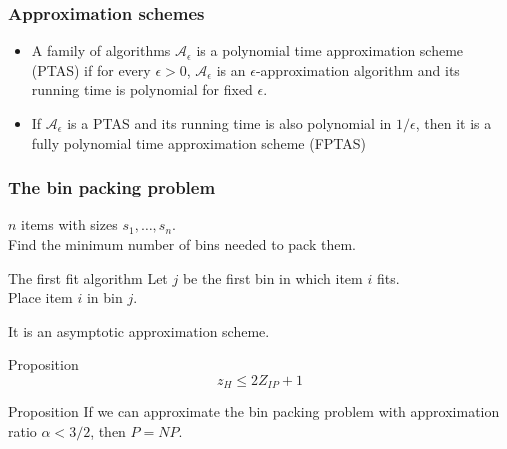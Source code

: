 \documentclass[9pt]{beamer}
\begin{document}
\begin{frame}
\frametitle{Approximation schemes}
\begin{itemize}
\item A family of algorithms $\mathcal A_{\epsilon}$ is a
\alert{polynomial time approximation scheme (PTAS)}
if for every $\epsilon>0$, $\mathcal A_{\epsilon}$ is an $\epsilon$-approximation
algorithm and its running time is polynomial for fixed $\epsilon$.\bigskip
\item If $\mathcal A_{\epsilon}$ is a PTAS and its running time is also
polynomial in $1/\epsilon$, then it is a 
\alert{fully polynomial time approximation scheme (FPTAS)}
\end{itemize}
\end{frame}
\begin{frame}
\frametitle{The bin packing problem}
$n$ items with sizes $s_1, \ldots, s_n$.\\
Find the minimum number of bins needed to \alert{pack them}.
\begin{block}{The first fit algorithm}
Let $j$ be the \alert{first bin} in which item $i$ \alert{fits}.\\
Place item $i$ in bin $j$.
\end{block}
It is an asymptotic approximation scheme.
\begin{block}{Proposition}
$$z_H \leq 2Z_{IP} + 1$$
\end{block}
\begin{block}{Proposition}
If we can approximate the bin packing problem with approximation ratio 
$\alpha<3/2$, then $P=NP$.
\end{block}
\end{frame}
\end{document}
